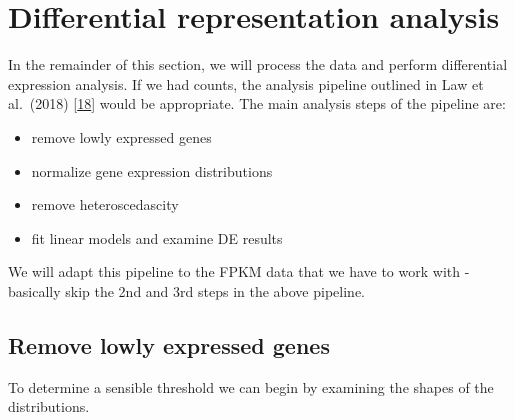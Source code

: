 \documentclass[
]{book}
\providecommand{\tightlist}{%
  \setlength{\itemsep}{0pt}\setlength{\parskip}{0pt}}
\begin{document}
\hypertarget{breast-rnaseq-dra}{%
\section{Differential representation analysis}\label{breast-rnaseq-dra}}

In the remainder of this section, we will process the data and
perform differential expression analysis. If we had counts,
the analysis pipeline outlined in Law et al.~(2018) {[}\protect\hyperlink{ref-Law:2018aa}{18}{]}
would be appropriate. The main analysis steps of the pipeline are:

\begin{itemize}
\tightlist
\item
  remove lowly expressed genes
\item
  normalize gene expression distributions
\item
  remove heteroscedascity
\item
  fit linear models and examine DE results
\end{itemize}

We will adapt this pipeline to the FPKM data that we have to work with - basically
skip the 2nd and 3rd steps in the above pipeline.

\hypertarget{remove-lowly-expressed-genes-1}{%
\subsection*{Remove lowly expressed genes}\label{remove-lowly-expressed-genes-1}}

To determine a sensible threshold we can begin by examining the shapes of the distributions.
\end{document}
